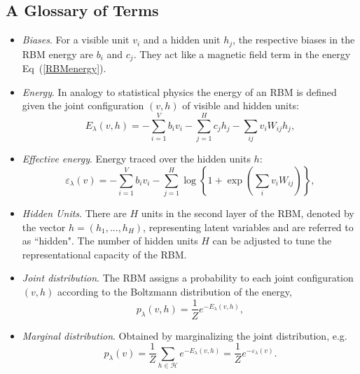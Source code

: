 \documentclass[submission, Phys]{SciPost}
\begin{document}
\subsection{A Glossary of Terms}

\begin{itemize}

\item {\it Biases}.  For a visible unit $v_i$ and a hidden unit $h_j$, the respective biases in the RBM energy are $b_i$ and $c_j$. They act like a magnetic field term in the energy Eq~(\ref{RBMenergy}).

\item {\it Energy}.  In analogy to statistical physics the energy of an RBM is defined given the joint configuration $(v,h)$ of visible and hidden units:
\begin{equation}
E_{\lambda}(v,h) = - \sum\limits_{i=1}^V b_i v_i - \sum\limits_{j=1}^H c_j h_j - \sum\limits_{ij} v_i W_{ij} h_j, \label{RBMenergy} 
\end{equation}

\item {\it Effective energy}.  Energy traced over the hidden units $h$:
\begin{equation}
\varepsilon_{\lambda}(v) = - \sum\limits_{i=1}^V b_i v_i - \sum\limits_{j=1}^H \log \left\{ 1 + \exp \left( \sum\limits_{i} v_i W_{ij} \right) \right\}, \label{RBMeffectiveenergy} 
\end{equation}

\item {\it Hidden Units}.  There are $H$ units in the second layer of the RBM, denoted by the vector $h=(h_1, ..., h_H)$, representing latent variables and are referred to as ``hidden".  The number of hidden units $H$ can be adjusted to tune the representational capacity of the RBM.

\item {\it Joint distribution}.  The RBM assigns a probability to each joint configuration $(v,h)$ according to the Boltzmann distribution of the energy,
\begin{equation}
    p_{\lambda}(v,h) = \frac{1}{Z} e^{-E_{\lambda}(v,h)},
\end{equation}

\item {\it Marginal distribution}.  Obtained by marginalizing the joint distribution, e.g.
\begin{equation}
\label{Eq:marginal_distribution}
    p_{\lambda}(v) = \frac{1}{Z} \sum\limits_{h\in \mathcal{H}} e^{-E_{\lambda}(v,h)} = \frac{1}{Z} e^{- \varepsilon_{\lambda}(v)}.
\end{equation}


\end{itemize}
\end{document}
